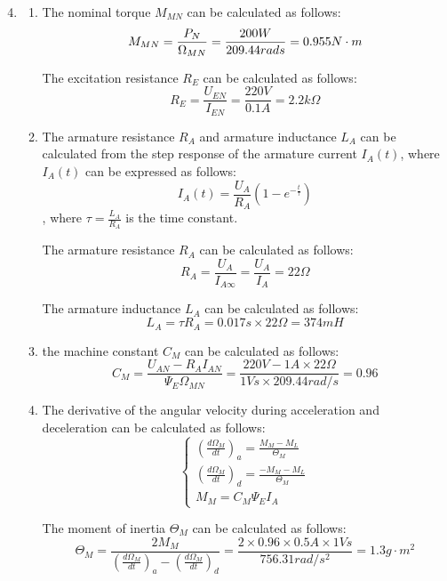 \documentclass[12pt,a4paper, openany]{book}
\begin{document}
\begin{enumerate}
\setcounter{enumi}{3} %
\item {\bf *} 

\begin{enumerate}
\item {\bf} 
The nominal torque $M_{MN}$ can be calculated as follows:
\begin{equation}
    M_{MN} = \frac{P_{N}}{\Omega_{MN}} = \frac{200W}{209.44rad\/s} = 0.955 N\cdot m
\end{equation}

The excitation resistance $R_E$ can be calculated as follows:
\begin{equation}
    R_E = \frac{U_{EN}}{I_{EN}} = \frac{220V}{0.1A} = 2.2k\Omega
\end{equation}
\item {\bf} 
The armature resistance $R_A$ and armature inductance $L_A$ can be calculated from the step response of the armature current $I_A(t)$, where $I_A(t)$ can be expressed as follows:
\begin{equation}
    I_A(t) = \frac{U_A}{R_A} \left(1 - e^{-\frac{t}{\tau}}\right)
\end{equation}
, where $\tau = \frac{L_A}{R_A}$ is the time constant.

The armature resistance $R_A$ can be calculated as follows:
\begin{equation}
    R_A = \frac{U_A}{I_{A\infty}} = \frac{U_A}{I_A}= 22 \Omega
\end{equation}

The armature inductance $L_A$ can be calculated as follows:
\begin{equation}
    L_A = \tau R_A = 0.017s \times 22 \Omega = 374mH    
\end{equation}
\item {\bf}  the machine constant $C_M$ can be calculated as follows:
\begin{equation}
    C_M = \frac{U_{AN} - R_A I_{AN}}{\Psi_E \Omega_{MN}} = \frac{220V-1A\times 22\Omega}{1Vs \times 209.44rad/s} = 0.96
\end{equation}
\item {\bf} 
The derivative of the angular velocity during acceleration and deceleration can be calculated as follows:
\begin{equation}
    \begin{cases}
        (\frac{d\Omega_M}{dt})_a = \frac{M_M - M_L}{\Theta_M} \\
        (\frac{d\Omega_M}{dt})_d = \frac{-M_M-M_L}{\Theta_M} \\
        M_M = C_M \Psi_E I_A
    \end{cases}
\end{equation}

The moment of inertia $\Theta_M$ can be calculated as follows:
\begin{equation}
    \Theta_M = \frac{2M_M}{(\frac{d\Omega_M}{dt})_a - (\frac{d\Omega_M}{dt})_d} = 
    \frac{2\times 0.96 \times 0.5A \times 1Vs}{756.31rad/s^2} = 1.3 g\cdot m^2
\end{equation}
\end{enumerate}
\end{enumerate}
\end{document}
